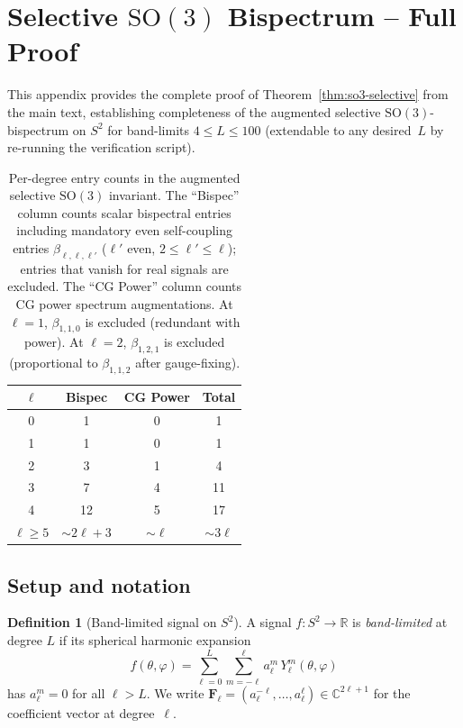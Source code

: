 \documentclass{article}
\theoremstyle{definition}
\newtheorem{definition}[theorem]{Definition}
\theoremstyle{remark}
\newcommand{\R}{\mathbb{R}}
\newcommand{\C}{\mathbb{C}}
\newcommand{\SO}{\mathrm{SO}}
\newcommand{\SH}{Y}
\theoremstyle{definition}
\begin{document}



\appendix

\section{Selective $\SO(3)$ Bispectrum -- Full Proof}
\label{app:so3-proof}

This appendix provides the complete proof of Theorem~\ref{thm:so3-selective}
from the main text, establishing completeness of the augmented selective
$\SO(3)$-bispectrum on $S^2$ for band-limits $4 \le L \le 100$
(extendable to any desired~$L$ by re-running the verification script).

\begin{table}[h]
  \caption{Per-degree entry counts in the augmented selective $\SO(3)$
    invariant. The ``Bispec'' column counts scalar bispectral
    entries including mandatory even self-coupling entries
    $\beta_{\ell,\ell,\ell'}$ ($\ell'$ even, $2 \le \ell' \le \ell$);
    entries that vanish for real signals are excluded.
    The ``CG Power'' column counts CG power spectrum augmentations.
    At $\ell=1$, $\beta_{1,1,0}$ is excluded (redundant with power).
    At $\ell=2$, $\beta_{1,2,1}$ is excluded (proportional to
    $\beta_{1,1,2}$ after gauge-fixing).}
  \label{tab:entry-counts}
  \centering
  \small
  \begin{tabular}{cccc}
    \toprule
    $\ell$ & Bispec & CG Power & Total \\
    \midrule
    0 & 1 & 0 & 1 \\
    1 & 1 & 0 & 1 \\
    2 & 3 & 1 & 4 \\
    3 & 7 & 4 & 11 \\
    4 & 12 & 5 & 17 \\
    $\ell \ge 5$ & $\sim 2\ell{+}3$ & $\sim \ell$ & $\sim 3\ell$ \\
    \bottomrule
  \end{tabular}
\end{table}

\subsection{Setup and notation}

\begin{definition}[Band-limited signal on $S^2$]
A signal $f : S^2 \to \R$ is \emph{band-limited} at degree $L$ if its
spherical harmonic expansion
\begin{equation}\label{eq:app-sh-expansion}
  f(\theta, \varphi)
  = \sum_{\ell=0}^{L} \sum_{m=-\ell}^{\ell}
    a_\ell^m \, \SH_\ell^m(\theta, \varphi)
\end{equation}
has $a_\ell^m = 0$ for all $\ell > L$. We write
$\mathbf{F}_\ell = (a_\ell^{-\ell}, \dotsc, a_\ell^{\ell})
  \in \C^{2\ell+1}$
for the coefficient vector at degree~$\ell$.
\end{definition}
\end{document}

